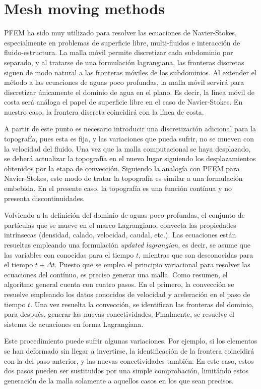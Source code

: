\section{Mesh moving methods}


PFEM ha sido muy utilizado para resolver las ecuaciones de Navier-Stokes, especialmente en problemas de superficie libre, multi-fluidos e interacción de fluido-estructura. La malla móvil permite discretizar cada subdominio por separado, y al tratarse de una formulación lagrangiana, las fronteras discretas siguen de modo natural a las fronteras móviles de los subdominios. Al extender el método a las ecuaciones de aguas poco profundas, la malla móvil servirá para discretizar únicamente el dominio de agua en el plano. Es decir, la línea móvil de costa será análoga el papel de superficie libre en el caso de Navier-Stokes. En nuestro caso, la frontera discreta coincidirá con la línea de costa.

A partir de este punto es necesario introducir una discretización adicional para la topografía, pues esta es fija, y las variaciones que pueda sufrir, no se mueven con la velocidad del fluido. Una vez que la malla computacional se haya desplazado, se deberá actualizar la topografía en el nuevo lugar siguiendo los desplazamientos obtenidos por la etapa de convección. Siguiendo la analogía con PFEM para Navier-Stokes, este modo de tratar la topografía es similar a una formulación embebida. En el presente caso, la topografía es una función contínua y no presenta discontinuidades.

Volviendo a la definición del dominio de aguas poco profundas, el conjunto de partículas que se mueve en el marco Lagrangiano, convecta las propiedades intrínsecas (densidad, calado, velocidad, caudal, etc.). Las ecuaciones están resueltas empleando una formulación \emph{updated lagrangian}, es decir, se asume que las variables con conocidas para el tiempo $t$, mientras que son desconocidas para el tiempo $t+\Delta t$. Puesto que se emplea el principio variacional para resolver las ecuaciones del contínuo, es preciso generar una malla. Como resumen, el algoritmo general cuenta con cuatro pasos. En el primero, la convección se resuelve empleando los datos conocidos de velocidad y aceleración en el paso de tiempo $t$. Una vez resuelta la convección, se identifican las fronteras del dominio, para después, generar las nuevas conectividades. Finalmente, se resuelve el sistema de acuaciones en forma Lagrangiana.

Este procedimiento puede sufrir algunas variaciones. Por ejemplo, si los elementos se han deformado sin llegar a invertirse, la identificación de la frontera coincidirá con la del paso anterior, y las nuevas conectividades también. En este caso, estos dos pasos pueden ser sustituidos por una simple comprobación, limitándo estos generación de la malla solamente a aquellos casos en los que sean precisos.

